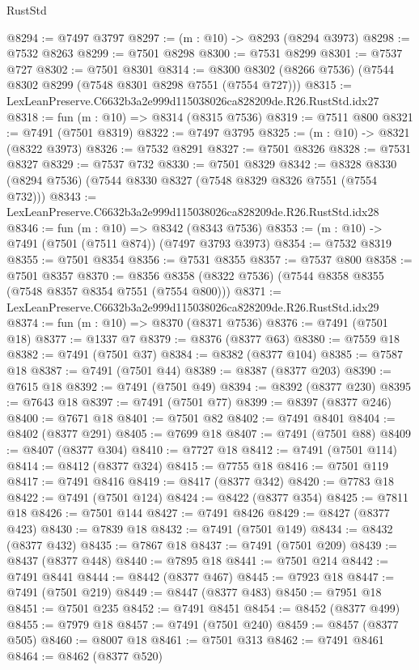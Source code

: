 \begin{lexlean}{RustStd}
\begin{coremodule}
@8294 := @7497 @3797
@8297 := (m : @10) -> @8293 (@8294 @3973)
@8298 := @7532 @8263
@8299 := @7501 @8298
@8300 := @7531 @8299
@8301 := @7537 @727
@8302 := @7501 @8301
@8314 := @8300 @8302 (@8266 @7536) (@7544 @8302 @8299 (@7548 @8301 @8298 @7551 (@7554 @727)))
@8315 := LexLeanPreserve.C6632b3a2e999d115038026ca828209de.R26.RustStd.idx27
@8318 := fun (m : @10) => @8314 (@8315 @7536)
@8319 := @7511 @800
@8321 := @7491 (@7501 @8319)
@8322 := @7497 @3795
@8325 := (m : @10) -> @8321 (@8322 @3973)
@8326 := @7532 @8291
@8327 := @7501 @8326
@8328 := @7531 @8327
@8329 := @7537 @732
@8330 := @7501 @8329
@8342 := @8328 @8330 (@8294 @7536) (@7544 @8330 @8327 (@7548 @8329 @8326 @7551 (@7554 @732)))
@8343 := LexLeanPreserve.C6632b3a2e999d115038026ca828209de.R26.RustStd.idx28
@8346 := fun (m : @10) => @8342 (@8343 @7536)
@8353 := (m : @10) -> @7491 (@7501 (@7511 @874)) (@7497 @3793 @3973)
@8354 := @7532 @8319
@8355 := @7501 @8354
@8356 := @7531 @8355
@8357 := @7537 @800
@8358 := @7501 @8357
@8370 := @8356 @8358 (@8322 @7536) (@7544 @8358 @8355 (@7548 @8357 @8354 @7551 (@7554 @800)))
@8371 := LexLeanPreserve.C6632b3a2e999d115038026ca828209de.R26.RustStd.idx29
@8374 := fun (m : @10) => @8370 (@8371 @7536)
@8376 := @7491 (@7501 @18)
@8377 := @1337 @7
@8379 := @8376 (@8377 @63)
@8380 := @7559 @18
@8382 := @7491 (@7501 @37)
@8384 := @8382 (@8377 @104)
@8385 := @7587 @18
@8387 := @7491 (@7501 @44)
@8389 := @8387 (@8377 @203)
@8390 := @7615 @18
@8392 := @7491 (@7501 @49)
@8394 := @8392 (@8377 @230)
@8395 := @7643 @18
@8397 := @7491 (@7501 @77)
@8399 := @8397 (@8377 @246)
@8400 := @7671 @18
@8401 := @7501 @82
@8402 := @7491 @8401
@8404 := @8402 (@8377 @291)
@8405 := @7699 @18
@8407 := @7491 (@7501 @88)
@8409 := @8407 (@8377 @304)
@8410 := @7727 @18
@8412 := @7491 (@7501 @114)
@8414 := @8412 (@8377 @324)
@8415 := @7755 @18
@8416 := @7501 @119
@8417 := @7491 @8416
@8419 := @8417 (@8377 @342)
@8420 := @7783 @18
@8422 := @7491 (@7501 @124)
@8424 := @8422 (@8377 @354)
@8425 := @7811 @18
@8426 := @7501 @144
@8427 := @7491 @8426
@8429 := @8427 (@8377 @423)
@8430 := @7839 @18
@8432 := @7491 (@7501 @149)
@8434 := @8432 (@8377 @432)
@8435 := @7867 @18
@8437 := @7491 (@7501 @209)
@8439 := @8437 (@8377 @448)
@8440 := @7895 @18
@8441 := @7501 @214
@8442 := @7491 @8441
@8444 := @8442 (@8377 @467)
@8445 := @7923 @18
@8447 := @7491 (@7501 @219)
@8449 := @8447 (@8377 @483)
@8450 := @7951 @18
@8451 := @7501 @235
@8452 := @7491 @8451
@8454 := @8452 (@8377 @499)
@8455 := @7979 @18
@8457 := @7491 (@7501 @240)
@8459 := @8457 (@8377 @505)
@8460 := @8007 @18
@8461 := @7501 @313
@8462 := @7491 @8461
@8464 := @8462 (@8377 @520)

\end{coremodule}
\end{lexlean}
